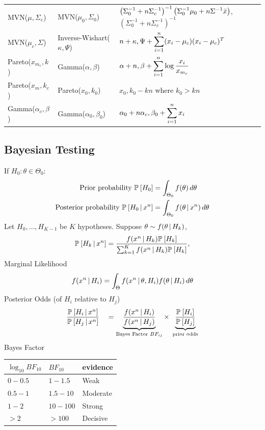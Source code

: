 \documentclass[landscape]{article}
\begin{document}
\begin{multicols*}{2}
\begin{tabular}{|l|p{}|p{}|}
  MVN($\mu,\Sigma_c$) & MVN($\mu_0,\Sigma_0$) &
  $\displaystyle\left( \Sigma_0^{-1}+ n\Sigma_c^{-1} \right)^{-1}
  \left( \Sigma_0^{-1}\mu_0 + n\Sigma^{-1} \bar{x} \right)$,
  $\displaystyle\left( \Sigma_0^{-1} + n \Sigma_c^{-1} \right)^{-1}$ \\[1ex]

  MVN($\mu_c,\Sigma$) & Inverse-Wishart($\kappa,\Psi$) &
  $\displaystyle n + \kappa, \Psi + \sum_{i=1}^n(x_i-\mu_c)(x_i-\mu_c)^T$\\

  Pareto($x_{m_c}, k$) & Gamma($\alpha,\beta$) &
  $\displaystyle\alpha+n, \beta + \sum_{i=1}^n \log\frac{x_i}{x_{m_c}}$ \\

  Pareto($x_m, k_c$) & Pareto($x_0, k_0$) &
  $\displaystyle x_0, k_0 - kn$ where $k_0 > kn$ \\

  Gamma($\alpha_c, \beta$) & Gamma($\alpha_0, \beta_0$) &
  $\displaystyle \alpha_0 + n\alpha_c, \beta_0 + \sum_{i=1}^n x_i$ \\[3ex]

  \hline
\end{tabular}

\subsection{Bayesian Testing}
If $H_0:\theta \in \Theta_0$:
\begin{align*}
  \text{Prior probability } \mathbb{P}_{}\left[H_0\right] &= \int_{\Theta_0} f(\theta)\,d\theta\\
  \text{Posterior probability } \mathbb{P}_{}\left[H_0\,|\, x^n\right] &= 
    \int_{\Theta_0} f(\theta\,|\, x^n)\,d\theta\\
\end{align*} 
Let $H_0,\ldots,H_{K-1}$ be $K$ hypotheses. Suppose
$\theta \sim f(\theta\,|\, H_k)$,
$$\mathbb{P}_{}\left[H_k\,|\, x^n\right] 
= \frac{f(x^n\,|\, H_k)\mathbb{P}_{}\left[H_k\right]}{\sum_{k=1}^K f(x^n\,|\, H_k)\mathbb{P}_{}\left[H_k\right]},$$
Marginal Likelihood
$$f(x^n\,|\, H_i) 
= \int_\Theta f(x^n\,|\, \theta,H_i)f(\theta\,|\, H_i) \,d\theta$$
Posterior Odds (of $H_i$ relative to $H_j$)
$$\frac{\Pr{H_i\giv x^n}}{\Pr{H_j\giv x^n}} \quad
= \underbrace{\frac{f(x^n\giv H_i)}{f(x^n\giv H_j)}}%
  _{\text{Bayes Factor }BF_{ij}} 
\times \;\underbrace{\frac{\Pr{H_i}}{\Pr{H_j}}}_{\text{prior odds}}$$
Bayes Factor

\centering
\begin{tabular}{lll}
  $\log_{10} BF_{10}$ & $BF_{10}$ & \textsf{evidence} \\
  \hline
  $0 - 0.5$ & $1 - 1.5$   & Weak \\
  $0.5 - 1$ & $1.5 - 10$  & Moderate \\
  $1 - 2$   & $10 - 100$  & Strong \\
  $> 2$     & $> 100$     & Decisive \\
\end{tabular}


\end{multicols*}
\end{document}
